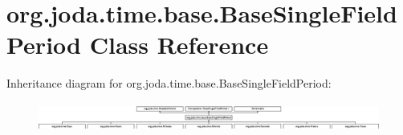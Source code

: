 \hypertarget{classorg_1_1joda_1_1time_1_1base_1_1_base_single_field_period}{\section{org.\-joda.\-time.\-base.\-Base\-Single\-Field\-Period Class Reference}
\label{classorg_1_1joda_1_1time_1_1base_1_1_base_single_field_period}
}
Inheritance diagram for org.\-joda.\-time.\-base.\-Base\-Single\-Field\-Period\-:\begin{figure}[H]
\begin{center}
\leavevmode
\includegraphics[height=0.937500cm]{classorg_1_1joda_1_1time_1_1base_1_1_base_single_field_period}
\end{center}
\end{figure}
